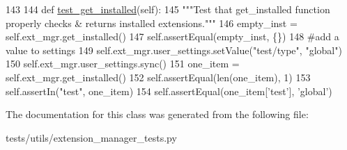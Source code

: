 \begin{DoxyCode}
143 
144     \textcolor{keyword}{def }\hyperlink{classtests_1_1utils_1_1extension__manager__tests_1_1GetConfigSettings_abb00849dbf033d220046921187102261}{test\_get\_installed}(self):
145         \textcolor{stringliteral}{"""Test that get\_installed function properly checks & returns installed extensions."""}
146         empty\_inst = self.ext\_mgr.get\_installed()
147         self.assertEqual(empty\_inst, \{\})
148         \textcolor{comment}{#add a value to settings}
149         self.ext\_mgr.user\_settings.setValue(\textcolor{stringliteral}{"test/type"}, \textcolor{stringliteral}{"global"})
150         self.ext\_mgr.user\_settings.sync()
151         one\_item = self.ext\_mgr.get\_installed()
152         self.assertEqual(len(one\_item), 1)
153         self.assertIn(\textcolor{stringliteral}{"test"}, one\_item)
154         self.assertEqual(one\_item[\textcolor{stringliteral}{'test'}], \textcolor{stringliteral}{'global'})
 
\end{DoxyCode}


The documentation for this class was generated from the following file\-:\begin{DoxyCompactItemize}
\item 
tests/utils/extension\-\_\-manager\-\_\-tests.\-py\end{DoxyCompactItemize}
